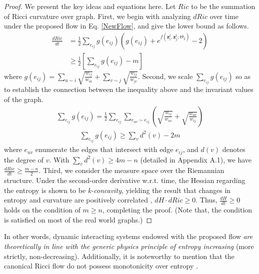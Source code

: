 \begin{mymath}
\begin{proof}
We present the key ideas and equations here. 
Let $Ric$ to be the summation of Ricci curvature over graph.
First, we begin with analyzing $dRic$ over time under the proposed flow in Eq. \ref{NewFlow}, and give the lower bound as follows.
\begin{align}
    \frac{dRic}{dt}
    &=\frac{1}{2}\sum\nolimits_{e_{ij}}g(e_{ij})\left(g(e_{ij})+e^{f(\boldsymbol{z}_i^t, \boldsymbol{z}_j^t; \Theta_2)}-2\right)\\
    &\geq \frac{1}{2}[\sum\nolimits_{e_{ij}}g(e_{ij})-m]
\end{align}
where $g(e_{ij})=\sum_{u\sim i}\sqrt{\frac{w_{ij}}{w_{iu}}}+\sum_{v\sim j}\sqrt{\frac{w_{ij}}{w_{jv}}}$. 
Second, we scale $\sum_{e_{ij}}g(e_{ij})$ so as to establish the connection between the inequality above and the invariant values of the graph.
\begin{align}
    \sum\limits_{e_{ij}}g(e_{ij})=\frac{1}{2}\sum_{e_{ij}}\sum_{e_{uv}\sim e_{ij}}\left(\sqrt{\frac{w_{ij}}{w_{uv}}}+\sqrt{\frac{w_{uv}}{w_{ij}}}\right) 
\end{align}
\begin{align}
    \sum\nolimits_{e_{ij}}g(e_{ij}) \geq \sum\nolimits_{v}d^2(v)-2m
\end{align}
where $e_{uv}$ enumerate the edges that intersect with edge $e_{ij}$, and $d(v)$ denotes the degree of $v$.
With $\sum_{v}d^2(v)\geq 4m-n$ (detailed in Appendix A.1), we have  $\frac{dRic}{dt}\ge\frac{m-n}{2}$.
Third, we consider the measure space over the Riemannian structure.
Under the second-order derivative w.r.t. time,
the Hessian regarding the entropy is shown to be \emph{k-concavity}, 
yielding the result that changes in entropy and curvature are positively correlated \cite{math09RiccOT},
$ dH \cdot dRic \geq 0$.
Thus, $\frac{ dH}{dt}\ge 0$ holds on the condition of $m\ge n$, completing the proof. 
(Note that, the condition  is satisfied on most of the real world graphs.)
\end{proof}
\end{mymath}
\noindent In other words, dynamic interacting systems endowed with the proposed flow
\emph{are theoretically in line with the generic physics principle of entropy increasing} (more strictly, non-decreasing).
Additionally, it is noteworthy to mention that the canonical Ricci flow do not possess monotonicity over entropy \cite{baptista2024}.



